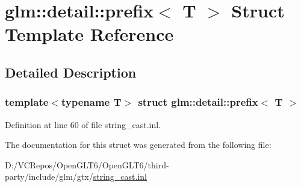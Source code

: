 \hypertarget{structglm_1_1detail_1_1prefix}{}\section{glm\+::detail\+::prefix$<$ T $>$ Struct Template Reference}
\label{structglm_1_1detail_1_1prefix}


\subsection{Detailed Description}
\subsubsection*{template$<$typename T$>$\newline
struct glm\+::detail\+::prefix$<$ T $>$}



Definition at line 60 of file string\+\_\+cast.\+inl.



The documentation for this struct was generated from the following file\+:\begin{DoxyCompactItemize}
\item 
D\+:/\+V\+C\+Repos/\+Open\+G\+L\+T6/\+Open\+G\+L\+T6/third-\/party/include/glm/gtx/\mbox{\hyperlink{string__cast_8inl}{string\+\_\+cast.\+inl}}\end{DoxyCompactItemize}
